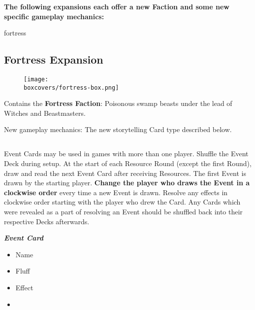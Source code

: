 \textbf{The following expansions each offer a new Faction and some new specific gameplay mechanics:}
\begin{multicols}{2}
\begin{expansion}[title=]{fortress}
  \subsection*{\color{fortress}Fortress Expansion}
  \setlength\intextsep{0pt}
  \setlength\columnsep{0.8em}
  \begin{wrapfigure}{l}{0.35\textwidth}
      \texttt{[image: \\boxcovers/fortress-box.png]}
  \end{wrapfigure}
  Contains the \textbf{Fortress Faction}: Poisonous swamp beasts under the lead of Witches and Beastmasters.\par
  \medskip
  New gameplay mechanics: The new storytelling Card type described below.
  \medskip
  \subsection*{}
  Event Cards may be used in games with more than one player.
  Shuffle the Event Deck during setup.
  At the start of each Resource Round (except the first Round), draw and read the next Event Card after receiving Resources.
  The first Event is drawn by the starting player.
  \textbf{Change the player who draws the Event in a clockwise order} every time a new Event is drawn.
  Resolve any effects in clockwise order starting with the player who drew the Card.
  Any Cards which were revealed as a part of resolving an Event should be shuffled back into their respective Decks afterwards.

  \medskip

  \begin{minipage}[h]{\linewidth}
  \vspace{0.1pt}
  \centering
  \begin{scriptsize}
  \end{scriptsize}
  \footnotesize
  \textbf{\textit{\textcolor{darkcandyapplered}{Event Card}}}
  \begin{multicols}{2}
    \begin{itemize}
    \item[\textbf{1.}] Name
    \item[\textbf{2.}] Fluff
    \item[\textbf{3.}] Effect
    \item[\textbf{\phantom{.}}] \phantom{.}
    \end{itemize}
  \end{multicols}
  \end{minipage}
\end{expansion}


\end{multicols}

